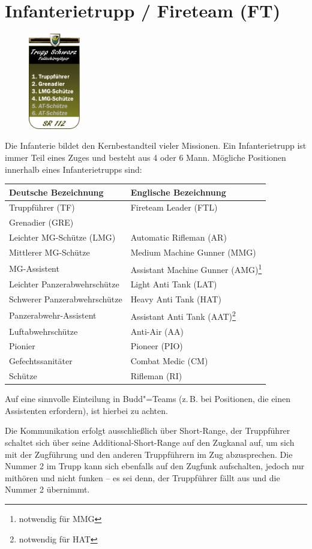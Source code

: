 \section{Infanterietrupp / Fireteam (FT)}
\begin{figure}
	\vspace{-10pt}
	\centering 
	\includegraphics[width=0.2\textwidth]{../img/truppenordnung/infanterie/infanterie}
	\vspace{-90pt}
\end{figure}
Die Infanterie bildet den Kernbestandteil vieler Missionen. Ein Infanterietrupp ist immer Teil eines Zuges und besteht aus 4 oder 6 Mann. Mögliche Positionen innerhalb eines Infanterietrupps sind:
\vspace{3.5cm}
\begin{longtable}{@{}P{0.4\textwidth}P{0.4\textwidth}@{}}
	\toprule
	Deutsche Bezeichnung & Englische Bezeichnung\\
	\midrule
	Truppführer (TF) & Fireteam Leader (FTL)\\
	Grenadier (GRE) & \\
	Leichter MG-Schütze (LMG) & Automatic Rifleman (AR)\\
	Mittlerer MG-Schütze & Medium Machine Gunner (MMG) \\
	MG-Assistent & Assistant Machine Gunner (AMG)\footnote{notwendig für MMG}\\ 
	Leichter Panzerabwehrschütze & Light Anti Tank (LAT)\\
	Schwerer Panzerabwehrschütze & Heavy Anti Tank (HAT)\\
	Panzerabwehr-Assistent & Assistant Anti Tank (AAT)\footnote{notwendig für HAT}\\ 
	Luftabwehrschütze & Anti-Air (AA)\\
	Pionier & Pioneer (PIO)\\
	Gefechtssanitäter & Combat Medic (CM)\\
	Schütze & Rifleman (RI)\\			
	\bottomrule					
\end{longtable}


Auf eine sinnvolle Einteilung in Budd"=Teams (z.\,B. bei Positionen, die einen Assistenten erfordern), ist hierbei zu achten.\par
Die Kommunikation erfolgt ausschließlich über Short-Range, der Truppführer schaltet sich über seine Additional-Short-Range auf den Zugkanal auf, um sich mit der Zugführung und den anderen Truppführern im Zug abzusprechen. Die Nummer 2 im Trupp kann sich ebenfalls auf den Zugfunk aufschalten, jedoch nur mithören und nicht funken -- es sei denn, der Truppführer fällt aus und die Nummer 2 übernimmt.